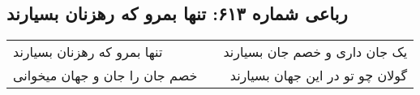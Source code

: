 \begin{center}
\section*{رباعی شماره ۶۱۳: تنها بمرو که رهزنان بسیارند}
\label{sec:0613}
\begin{longtable}{l p{0.5cm} r}
تنها بمرو که رهزنان بسیارند
&&
یک جان داری و خصم جان بسیارند
\\
خصم جان را جان و جهان میخوانی
&&
گولان چو تو در این جهان بسیارند
\\
\end{longtable}
\end{center}
